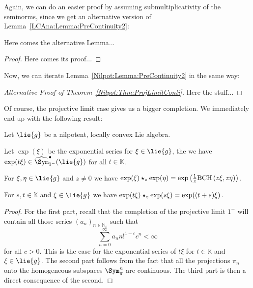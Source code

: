 Again, we can do an easier proof by assuming submultiplicativity of the seminorms, since we get an alternative version of 
Lemma~\ref{LCAna:Lemma:PreContinuity2}:
\begin{lemma}
	Here comes the alternative Lemma...
\end{lemma}
\begin{proof}
	Here comes its proof...
\end{proof}
Now, we can iterate Lemma~\ref{Nilpot:Lemma:PreContinuity2} in the same way:
\begin{proof}[Alternative Proof of Theorem~\ref{Nilpot:Thm:ProjLimitConti}]
	Here the stuff...
\end{proof}
Of course, the projective limit case gives us a bigger completion. We
immediately end up with the following result:
\begin{corollary}
    \label{corollary:NilpotentCase}%
    Let $\lie{g}$ be a nilpotent, locally convex Lie algebra.
    \begin{corollarylist}
    \item \label{item:NilpotentHasExp} 
    		Let $\exp(\xi)$ be the
        exponential series for $\xi \in \lie{g}$, the we have $\exp(t
        \xi) \in \widehat{\Sym}_{1^-}^\bullet(\lie{g})$ for all $t
        \in \mathbb{K}$.
    \item \label{item:NilpotentExpGivesBCH} 
    		For $\xi, \eta \in
        \lie{g}$ and $z \neq 0$ we have $\exp(\xi) \star_z
        \exp(\eta) = \exp \left(\frac 1 z \mathrm{BCH}\left(z \xi, z \eta\right)
        \right)$.
    \item \label{item:NipotentOneParameterGroups}
    		For $s,t \in
        \mathbb{K}$ and $\xi \in \lie{g}$ we have $\exp(t \xi)
        \star_z \exp(s \xi) = \exp ((t + s) \xi)$.
    \end{corollarylist}
\end{corollary}
\begin{proof}
    For the first part, recall that the completion of the projective
    limit $1^-$ will contain all those series $(a_n)_{n \in
      \mathbb{N}_0}$ such that
    \begin{equation*}
        \sum\limits_{n=0}^{\infty}
        a_n n!^{1 - \epsilon} c^n
        <
        \infty
    \end{equation*}
    for all $c > 0$.  This is the case for the exponential series of
    $t \xi$ for $t \in \mathbb{K}$ and $\xi \in \lie{g}$. The second
    part follows from the fact that all the projections $\pi_n$ onto
    the homogeneous subspaces $\Sym_{\pi}^n$ are continuous. The third
    part is then a direct consequence of the second.
\end{proof}


